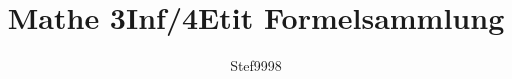 \documentclass[
    ngerman,
    accentcolor=9c,%
    type=intern,
    marginpar=false
]{tudapub}
\begin{document}

\title{Mathe 3Inf/4Etit Formelsammlung}
\author{Stef9998}

\maketitle
\tableofcontents
\newpage
\end{document}
